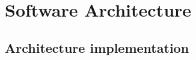 \documentclass{llncs2e/llncs}
\begin{document}
\section{Software Architecture}

\subsection{Architecture implementation}

\end{document}
